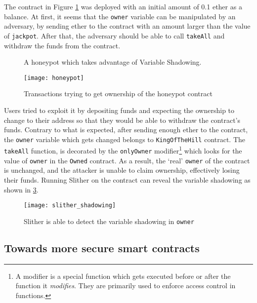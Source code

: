 The contract in Figure \ref{fig:owner_honeypot} was deployed with an initial amount of 0.1 ether as a balance. At first, it seems that the \texttt{owner} variable can be manipulated by an adversary, by sending ether to the contract with an amount larger than the value of \texttt{jackpot}. After that, the adversary should be able to call \texttt{takeAll} and withdraw the funds from the contract.

\begin{figure}[ht!]
    \centering
    
    \caption{A honeypot which takes advantage of Variable Shadowing.}
    \label{fig:owner_honeypot}
\end{figure}

\begin{figure}[ht!]
    \centering
    \texttt{[image: honeypot]}
    \caption{Transactions trying to get ownership of the honeypot contract}
    \label{fig:honeypot_tx}
\end{figure}

Users tried to exploit it by depositing funds and expecting the ownership to change to their address so that they would be able to withdraw the contract's funds. Contrary to what is expected, after sending enough ether to the contract, the \texttt{owner} variable which gets changed belongs to \texttt{KingOfTheHill} contract. The \texttt{takeAll} function, is decorated by the \texttt{onlyOwner} modifier\footnote{A modifier is a special function which gets executed before or after the function it \textit{modifies}. They are primarily used to enforce access control in functions.} which looks for the value of \texttt{owner} in the \texttt{Owned} contract. As a result, the `real' \texttt{owner} of the contract is unchanged, and the attacker is unable to claim ownership, effectively losing their funds. Running Slither on the contract can reveal the variable shadowing as shown in \ref{fig:slither_shadowing}.

\begin{figure}[H]
    \centering
    \texttt{[image: slither\_shadowing]}
    \caption{Slither is able to detect the variable shadowing in \texttt{owner}}
    \label{fig:slither_shadowing}
\end{figure}

\subsection{Towards more secure smart contracts}

